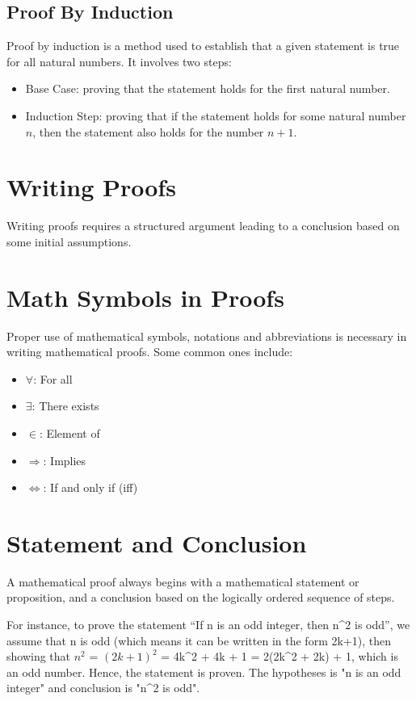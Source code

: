 \subsection{Proof By Induction}

Proof by induction is a method used to establish that a given statement is true for all natural numbers. It involves two steps:
\begin{itemize}
\item Base Case:  proving that the statement holds for the first natural number.
\item Induction Step:  proving that if the statement holds for some natural number $n$, then the statement also holds for the number $n + 1$.
\end{itemize}

\section{Writing Proofs}

Writing proofs requires a structured argument leading to a conclusion based on some initial assumptions. 

\section{Math Symbols in Proofs}

Proper use of mathematical symbols, notations and abbreviations is necessary in writing mathematical proofs. Some common ones include:
\begin{itemize}
\item $ \forall $: For all
\item $ \exists $: There exists
\item $ \in $: Element of
\item $ \Rightarrow $: Implies
\item $ \iff $: If and only if (iff)
\end{itemize}

\section{Statement and Conclusion}

A mathematical proof always begins with a mathematical statement or proposition, and a conclusion based on the logically ordered sequence of steps.

For instance, to prove the statement “If n is an odd integer, then n^2 is odd”, we assume that n is odd (which means it can be written in the form 2k+1), then showing that $n^2$ = $(2k+1)^2$ = 4k^2 + 4k + 1 = 2(2k^2 + 2k) + 1, which is an odd number. Hence, the statement is proven. The hypotheses is "n is an odd integer" and conclusion is "n^2 is odd".

